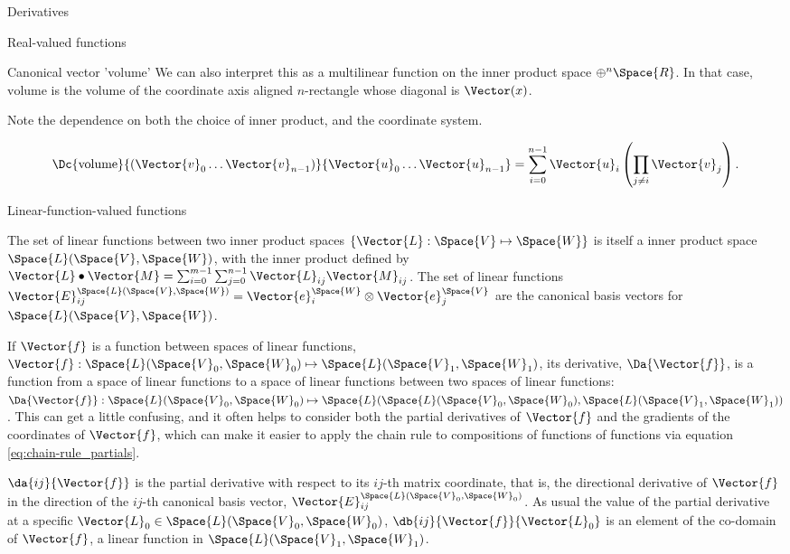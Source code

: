 \begin{plSection}{Derivatives}
\begin{plSection}{Real-valued functions}
\begin{plSection}{Canonical vector 'volume'}
We can also interpret this as a multilinear function on the
inner product space
$\oplus^{n} \Space{R}$.
In that case, $\text{volume}$ is the volume of the coordinate axis aligned
$n$-rectangle whose diagonal is $\Vector(x)$.

Note the dependence on both the choice of inner product, 
and the coordinate system.

\begin{equation}
\Dc{\text{volume}}{(\Vector{v}_0 \ldots \Vector{v}_{n-1})}{\Vector{u}_0 \ldots \Vector{u}_{n-1}}
 =  \sum_{i=0}^{n-1} \Vector{u}_i \left( \prod_{j \neq i} \Vector{v}_j \right).
\end{equation}

\end{plSection}%
\end{plSection}%
\begin{plSection}{Linear-function-valued functions}
\label{sec:Derivatives-of-linear-function-valued-functions}

The set of linear functions between two inner product spaces
$\{ \Vector{L} : \Space{V} \mapsto \Space{W} \}$
is itself a inner product space $\Space{L}(\Space{V},\Space{W})$,
with the inner product defined by
$\Vector{L} \bullet \Vector{M} = \sum_{i=0}^{m-1} \sum_{j=0}^{n-1} \Vector{L}_{ij} \Vector{M}_{ij}$.
The set of linear functions
$\Vector{E}_{ij}^{\Space{L}(\Space{V},\Space{W})}  = \Vector{e}_i^{\Space{W}} \otimes \Vector{e}_j^{\Space{V}}$
are the canonical basis vectors for $\Space{L}(\Space{V},\Space{W})$.

If $\Vector{f}$ is a function between spaces of linear functions,
$\Vector{f} : \Space{L}(\Space{V}_0,\Space{W}_0) \mapsto \Space{L}(\Space{V}_1,\Space{W}_1)$,
its derivative, $\Da{\Vector{f}}$,
is a function from a space of linear functions
to a space of linear functions between two
spaces of linear functions:
$\Da{\Vector{f}} : \Space{L}(\Space{V}_0,\Space{W}_0) \mapsto
\Space{L}(\Space{L}(\Space{V}_0,\Space{W}_0), \Space{L}(\Space{V}_1,\Space{W}_1))$.
This can get a little confusing,
and it often helps to consider both the partial derivatives of $\Vector{f}$
and the gradients of the coordinates of $\Vector{f}$,
which can make it easier to apply the chain rule to
compositions of functions of functions via equation \ref{eq:chain-rule_partials}.

$\da{ij}{\Vector{f}}$ is the partial derivative with respect to its $ij$-th matrix coordinate,
that is, the directional derivative of $\Vector{f}$ in the direction
of the $ij$-th canonical basis vector, $\Vector{E}_{ij}^{\Space{L}(\Space{V}_0,\Space{W}_0)}$.
As usual the value of the partial derivative at a specific
$\Vector{L}_0 \in  \Space{L}(\Space{V}_0,\Space{W}_0)$,
$\db{ij}{\Vector{f}}{\Vector{L}_0}$ is an element of the co-domain of $\Vector{f}$,
a linear function in  $\Space{L}(\Space{V}_1,\Space{W}_1)$.


\end{plSection}
\end{plSection}
